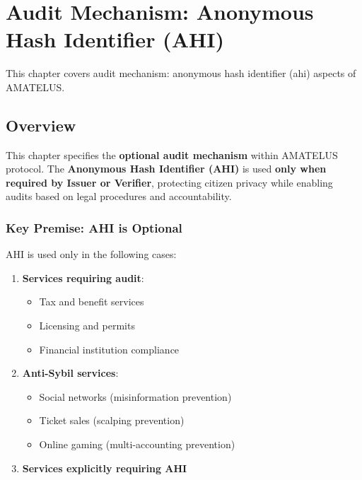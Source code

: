 
\chapter{Audit Mechanism: Anonymous Hash Identifier (AHI)}


\begin{definition}
  \label{def:aud-chapter}
  This chapter covers audit mechanism: anonymous hash identifier (ahi) aspects of AMATELUS.
  \leanok
\end{definition}
\section{Overview}

This chapter specifies the \textbf{optional audit mechanism} within AMATELUS protocol.
The \textbf{Anonymous Hash Identifier (AHI)} is used \textbf{only when required by Issuer or Verifier},
protecting citizen privacy while enabling audits based on legal procedures and accountability.

\subsection{Key Premise: AHI is Optional}

AHI is used only in the following cases:

\begin{enumerate}
  \item \textbf{Services requiring audit}:
    \begin{itemize}
      \item Tax and benefit services
      \item Licensing and permits
      \item Financial institution compliance
    \end{itemize}

  \item \textbf{Anti-Sybil services}:
    \begin{itemize}
      \item Social networks (misinformation prevention)
      \item Ticket sales (scalping prevention)
      \item Online gaming (multi-accounting prevention)
    \end{itemize}

  \item \textbf{Services explicitly requiring AHI}
\end{enumerate}


